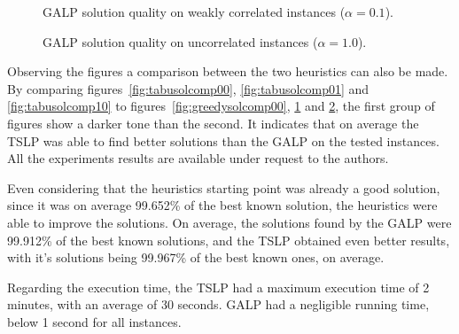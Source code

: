 \begin{figure}[H]
  \centering
  \resizebox{\columnwidth}{!}{%
    \subfloat[1 resource]{} 
    \subfloat[2 resources]{}
    \subfloat[4 resources]{}
  }
  \caption{GALP solution quality on weakly correlated instances ($\alpha = 0.1$).}
  \label{fig:greedysolcomp01}
\end{figure}

\begin{figure}[H]
  \centering
  \resizebox{\columnwidth}{!}{%
    \subfloat[1 resource]{} 
    \subfloat[2 resources]{}
    \subfloat[4 resources]{}
  }
  \caption{GALP solution quality on uncorrelated instances ($\alpha = 1.0$).}
  \label{fig:greedysolcomp10}
\end{figure}

Observing the figures a comparison between the two heuristics can also be made.
By comparing figures~\ref{fig:tabusolcomp00}, \ref{fig:tabusolcomp01} and \ref{fig:tabusolcomp10} to 
figures~\ref{fig:greedysolcomp00}, \ref{fig:greedysolcomp01} and \ref{fig:greedysolcomp10}, the first group 
of figures show a darker tone than the second. It indicates that on average the TSLP was able to find better
solutions than the GALP on the tested instances. All the experiments results are available under request to the authors.

Even considering that the heuristics starting point was already a good solution, since it was on average
99.652\% of the best known solution, the heuristics were able to improve the solutions. On average, 
the solutions found by the GALP were 99.912\% of the best known solutions, and the TSLP obtained 
even better results, with it's solutions being 99.967\% of the best known ones, on average.

Regarding the execution time, the TSLP had a maximum execution time of 2 minutes, with an average of 30 seconds.
GALP had a negligible running time, below 1 second for all instances.

